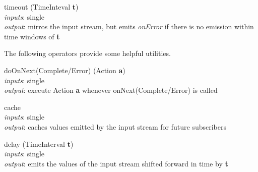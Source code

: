 \documentclass{dithesis}
\begin{document}
\begin{description}
\begin{minipage}[c]{0.4\linewidth}
\item[timeout] (TimeInteval \textbf{t})\\
	\textit{inputs}: single \\
	\textit{output}: mirros the input stream, but emits \textit{onError} if there is no emission within time windows of \textbf{t}
\end{minipage}
\begin{minipage}[c]{0.6\linewidth}

\end{minipage}

\end{description}

The following operators provide some helpful utilities.
\begin{description}

\begin{minipage}[c]{0.4\linewidth}
\item[doOnNext(Complete/Error)] (Action \textbf{a})\\
	\textit{inputs}: single \\
	\textit{output}: execute Action \textbf{a} whenever onNext(Complete/Error) is called
\end{minipage}
\begin{minipage}[c]{0.6\linewidth}

\end{minipage}

\begin{minipage}[c]{0.4\linewidth}
\item[cache] ~\\
	\textit{inputs}: single \\
	\textit{output}: caches values emitted by the input stream for future subscribers
\end{minipage}
\begin{minipage}[c]{0.6\linewidth}

\end{minipage}

\begin{minipage}[c]{0.4\linewidth}
\item[delay] (TimeInterval \textbf{t})\\
	\textit{inputs}: single \\
	\textit{output}: emits the values of the input stream shifted forward in time by \textbf{t}
\end{minipage}
\begin{minipage}[c]{0.6\linewidth}

\end{minipage}


\end{description}
\end{document}
